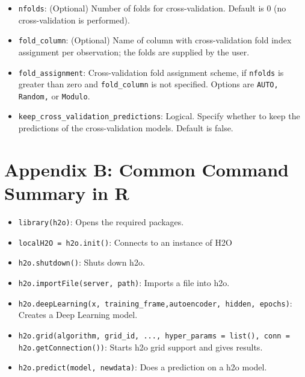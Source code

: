 \begin{itemize}
\item \texttt{nfolds}: (Optional) Number of folds for cross-validation. %
Default is 0 (no cross-validation is performed).

\item \texttt{fold\_column}: (Optional) Name of column with cross-validation fold index assignment per observation; the folds are supplied by the user. 

\item \texttt{fold\_assignment}: Cross-validation fold assignment scheme, if \texttt{nfolds} is greater than zero and \texttt{fold\_column} is not specified. Options are \texttt{AUTO, Random,} or \texttt{Modulo}. 

\item \texttt{keep\_cross\_validation\_predictions}: Logical.  Specify whether to keep the predictions of the cross-validation models.  Default is false.

\end{itemize}




\newpage

\section{Appendix B: Common Command Summary in R}
\begin{itemize}

\item \texttt{library(h2o)}: Opens the required packages.

\item \texttt{localH2O = h2o.init()}:  Connects to an instance of H2O

\item \texttt{h2o.shutdown()}: Shuts down h2o.

\item \texttt{h2o.importFile(server, path)}: Imports a file into h2o.

\item \texttt{h2o.deepLearning(x, training\_frame,autoencoder, hidden, epochs)}: Creates a Deep Learning model.

\item \texttt{h2o.grid(algorithm, grid\_id, ..., hyper\_params = list(), conn = h2o.getConnection())}: Starts h2o grid support and gives results.

\item \texttt{h2o.predict(model, newdata)}: Does a prediction on a h2o model.

\end{itemize}



